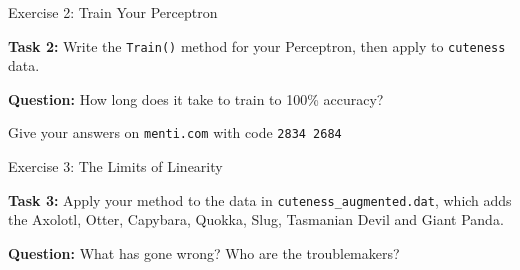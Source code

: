 \documentclass[]{SangerLibrary/sanger-present}
\begin{document}
	\begin{frame}[fragile]{Exercise 2: Train Your Perceptron}

			\textbf{Task 2:} Write the \verb|Train()| method for your Perceptron, then apply to \verb|cuteness| data.

			\vspace{1cm}

			\pause\textbf{Question:}	How long does it take to train to 100\% accuracy?

			\pause Give your answers on \verb|menti.com| with code \verb|2834 2684|
	\end{frame}

	\begin{frame}[fragile]{Exercise 3: The Limits of Linearity}
		
		\textbf{Task 3:} Apply your method to the data in \verb|cuteness_augmented.dat|, which adds the Axolotl, Otter, Capybara, Quokka, Slug, Tasmanian Devil and Giant Panda.

		\textbf{Question:} What has gone wrong? Who are the troublemakers?


	\end{frame}
\end{document}
